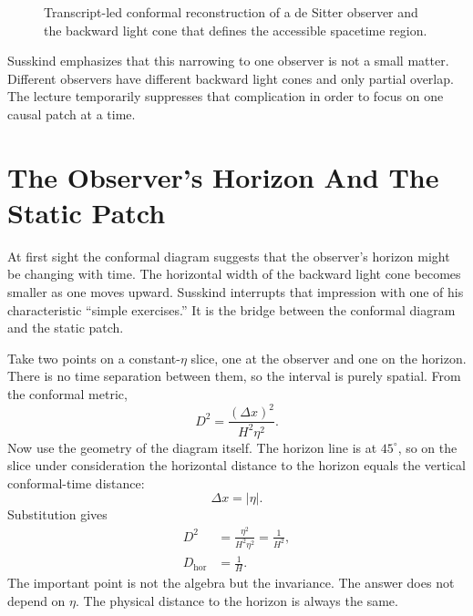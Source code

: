 \begin{figure}
\centering
{}
\caption{Transcript-led conformal reconstruction of a de Sitter observer and the backward light cone that defines the accessible spacetime region.}
\end{figure}

Susskind emphasizes that this narrowing to one observer is not a small matter. Different observers have different backward light cones and only partial overlap. The lecture temporarily suppresses that complication in order to focus on one causal patch at a time.

\section{The Observer's Horizon And The Static Patch}

At first sight the conformal diagram suggests that the observer's horizon might be changing with time. The horizontal width of the backward light cone becomes smaller as one moves upward. Susskind interrupts that impression with one of his characteristic ``simple exercises.'' It is the bridge between the conformal diagram and the static patch.

Take two points on a constant-\(\eta\) slice, one at the observer and one on the horizon. There is no time separation between them, so the interval is purely spatial. From the conformal metric,
\begin{equation}
D^2=\frac{(\Delta x)^2}{H^2\eta^2}.
\end{equation}
Now use the geometry of the diagram itself. The horizon line is at \(45^\circ\), so on the slice under consideration the horizontal distance to the horizon equals the vertical conformal-time distance:
\begin{equation}
\Delta x=|\eta|.
\end{equation}
Substitution gives
\begin{align}
D^2&=\frac{\eta^2}{H^2\eta^2}=\frac{1}{H^2},\\
D_{\text{hor}}&=\frac{1}{H}.
\end{align}
The important point is not the algebra but the invariance. The answer does not depend on \(\eta\). The physical distance to the horizon is always the same.

